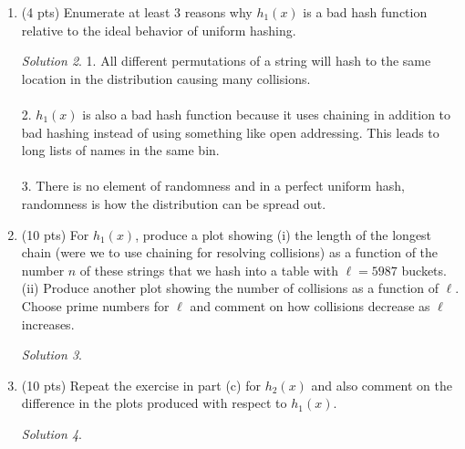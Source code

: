 \documentclass[12pt]{article}
\theoremstyle{remark}
\newtheorem*{solution}{Solution}
\begin{document}
\begin{enumerate}
\begin{enumerate}
	Hint: the raw file includes information other than the name strings, which will need to be removed; and, think about how you can count hash locations without building or using a real hash table.
	
	\begin{solution}
    
    \end{solution}
    \pagebreak
	
	
	\item (4 pts) Enumerate at least 3 reasons why $h_1(x)$ is a bad hash function relative to the ideal behavior of uniform hashing.
	\begin{solution}
    1. All different permutations of a string will hash to the same location in the distribution causing many collisions. \\ \\
2. $h_1(x)$ is also a bad hash function because it uses chaining in addition to bad hashing instead of using something like open addressing. This leads to long lists of names in the same bin. \\ \\
3. There is no element of randomness and in a perfect uniform hash, randomness is how the distribution can be spread out.
    \end{solution}
	\pagebreak
	
	\item 
		(10 pts) For $h_1(x)$, produce a plot showing (i) the length of the longest chain (were we to use chaining for resolving collisions) as a function of the number $n$ of these strings that we hash into a table with $\ell=5987$ buckets. (ii) Produce another plot showing the number of collisions as a function of $\ell$. Choose prime numbers for $\ell$ and comment on how collisions decrease as $\ell$ increases. 
    \begin{solution}
    
    \end{solution}
    \pagebreak
		
	\item (10 pts) Repeat the exercise in part (c) for $h_2(x)$ and also comment on the difference in the plots produced with respect to $h_1(x)$. 
	\begin{solution}
    
    \end{solution}
    \pagebreak
	
	


	\end{enumerate}
	

\end{enumerate}
\end{document}
